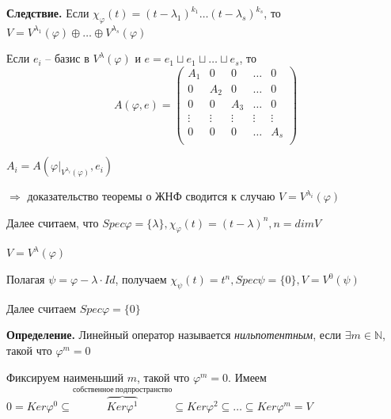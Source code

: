 \vspace{\baselineskip}
\textbf{Следствие.} Если $\chi_{\varphi} (t) = (t - \lambda_1)^{k_1} \dots (t - \lambda_s)^{k_s}$, то $V = V^{\lambda_1} (\varphi) \oplus \dots \oplus V^{\lambda_s} (\varphi)$

\vspace{\baselineskip}
Если $e_i$ -- базис в $V^{\lambda} (\varphi)$ и $e = e_1 \sqcup e_1 \sqcup \dots \sqcup e_s$, то \[A(\varphi, e) = \left(
\begin{array}{c|c|c|c|c}
  A_1 & 0 & 0 & \dots & 0  \\
  \hline
  0 & A_2 & 0 & \dots & 0  \\
  \hline
  0 & 0 & A_3 & \dots & 0 \\
  \hline
  \vdots & \vdots & \vdots & \vdots & \vdots \\
  \hline
  0 & 0 & 0 & \dots & A_s \\
\end{array}
\right)\]

$A_i = A(\varphi|_{V^{\lambda_i} (\varphi)}, e_i)$

$\Rightarrow$ доказательство теоремы о ЖНФ сводится к случаю $V = V^{\lambda_i} (\varphi)$

Далее считаем, что $Spec \varphi = \{ \lambda\}, \chi_{\varphi} (t) = (t - \lambda)^n, n = dim V$

$V = V^{\lambda} (\varphi)$

Полагая $\psi = \varphi - \lambda \cdot Id$, получаем $\chi_{\psi} (t) = t^n, Spec \psi = \{0\}, V = V^0 (\psi)$

Далее считаем $Spec \varphi = \{0\}$

\vspace{\baselineskip}
\textbf{Определение.} Линейный оператор называется \textit{нильпотентным}, если $\exists m \in \mathbb{N}$, такой что $\varphi^m = 0$

\vspace{\baselineskip}
Фиксируем наименьший $m$, такой что $\varphi^m = 0$. Имеем $0 = Ker \varphi^0 \subseteq \overbrace{Ker \varphi^1}^{собственное \ подпространство} \subseteq Ker \varphi^2 \subseteq \dots \subseteq Ker \varphi^m = V$

